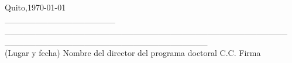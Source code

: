 \documentclass[a4paper,12pt]{article}
\begin{document}
\begin{flushleft}
	Quito,\today\\
	\_\_\_\_\_\_\_\_\_\_\_\_\_\_\_\_\_\_\hspace{0.1cm} \_\_\_\_\_\_\_\_\_\_\_\_\_\_\_\_\_\_\_\_\_\_\_\_\_\_\_\_\_\_\_\_\_\_\_\_\_\_\_\_\_\_\_\_\_\_  \hspace{0.3cm}\_\_\_\_\_\_\_\_\_\_\_\_\_\_\_\_\_\hspace{0.1cm}\_\_\_\_\_\_\_\_\_\_\_\_\_\_\_\_\\
	(Lugar y fecha) \hspace{0.0cm} Nombre del director del programa doctoral \hspace{1.3cm} C.C.\hspace{1cm} \hspace{0.1cm} Firma \\
\end{flushleft}

%		
%	
\end{document}
